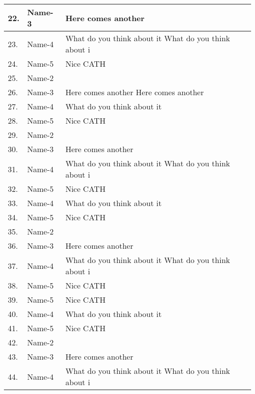 \documentclass{article}
\begin{document}
\begin{landscape}
\begin{longtable}{|p{2cm}| p{4cm}| p{12cm}|}
				22.      & Name-3                        & Here comes another \\ \hline
				23.      & Name-4                        & What do you think about it What do you think about i \\  \hline
				24.      & Name-5                        & Nice CATH \\   \hline
				25.      & Name-2                        & \\  \hline
				26.      & Name-3                        & Here comes another  Here comes another\\ \hline
				27.      & Name-4                        & What do you think about it \\  \hline
				28.      & Name-5                        & Nice CATH \\   \hline
				29.      & Name-2                        & \\  \hline
				30.      & Name-3                        & Here comes another \\ \hline
				31.      & Name-4                        & What do you think about it What do you think about i \\  \hline
				32.      & Name-5                        & Nice CATH \\   \hline
				33.      & Name-4                        & What do you think about it \\  \hline
				34.      & Name-5                        & Nice CATH \\   \hline
				35.      & Name-2                        & \\  \hline
				36.      & Name-3                        & Here comes another \\ \hline
				37.      & Name-4                        & What do you think about it What do you think about i \\  \hline
				38.      & Name-5                        & Nice CATH \\   \hline
				39.      & Name-5                        & Nice CATH \\   \hline
				40.      & Name-4                        & What do you think about it \\  \hline
				41.      & Name-5                        & Nice CATH \\   \hline
				42.      & Name-2                        & \\  \hline
				43.      & Name-3                        & Here comes another \\ \hline
				44.      & Name-4                        & What do you think about it What do you think about i \\ \hline
				
				
			\end{longtable}		
	\end{landscape}
	
	
	
	
\end{document}
